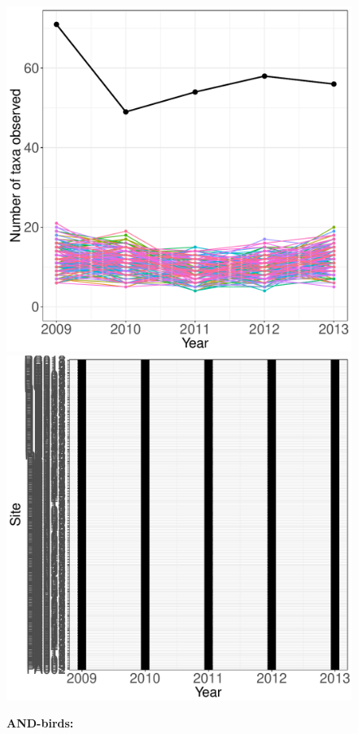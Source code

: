\documentclass[11pt, oneside]{article}
\begin{document}
\begin{figure}[h!]
\includegraphics[scale = 0.4]{and-birds-wisnoski_num_taxa_over_time.pdf}
\includegraphics[scale = 0.4]{and-birds-wisnoski_spatiotemporal_sampling_effort.pdf}
\caption{{\bf AND-birds:} }
\label{and-birds}
\end{figure}
\end{document}
